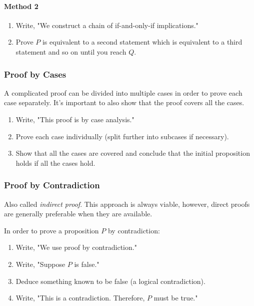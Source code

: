 \documentclass[../main.tex]{subfiles}
\begin{document}
\paragraph{Method 2}

\begin{enumerate}
  \item Write, "We construct a chain of if-and-only-if implications."
  \item Prove $P$ is equivalent to a second statement which is equivalent to a third statement and so on until you reach $Q$.
\end{enumerate}

\subsubsection{Proof by Cases}

A complicated proof can be divided into multiple cases in order to prove each case separately. It's important to also show that the proof covers all the cases.

\begin{enumerate}
  \item Write, "This proof is by case analysis."
  \item Prove each case individually (split further into subcases if necessary).
  \item Show that all the cases are covered and conclude that the initial proposition holds if all the cases hold.
\end{enumerate}

\subsubsection{Proof by Contradiction}

Also called \textit{indirect proof}. This approach is always viable, however, direct proofs are generally preferable when they are available.

In order to prove a proposition $P$ by contradiction:

\begin{enumerate}
  \item Write, "We use proof by contradiction."
  \item Write, "Suppose $P$ is false."
  \item Deduce something known to be false (a logical contradiction).
  \item Write, "This is a contradiction. Therefore, $P$ must be true."
\end{enumerate}
\end{document}
